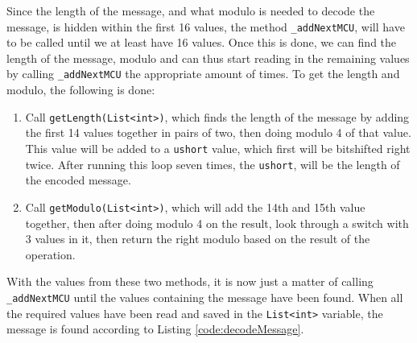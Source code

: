 Since the length of the message, and what modulo is needed to decode the message, is hidden within the first 16 values, the method \lstinline|_addNextMCU|, will have to be called until we at least have 16 values.
Once this is done, we can find the length of the message, modulo and can thus start reading in the remaining values by calling \lstinline|_addNextMCU| the appropriate amount of times.
To get the length and modulo, the following is done:
\begin{enumerate}
	\item Call \lstinline|getLength(List<int>)|, which finds the length of the message by adding the first 14 values together in pairs of two, then doing modulo 4 of that value. 
	This value will be added to a \lstinline|ushort| value, which first will be bitshifted right twice. 
	After running this loop seven times, the \lstinline|ushort|, will be the length of the encoded message.
	\item Call \lstinline|getModulo(List<int>)|, which will add the 14th and 15th value together, then after doing modulo 4 on the result, look through a switch with 3 values in it, then return the right modulo based on the result of the operation.
\end{enumerate}
With the values from these two methods, it is now just a matter of calling \lstinline|_addNextMCU| until the values containing the message have been found.
When all the required values have been read and saved in the \lstinline|List<int>| variable, the message is found according to Listing \ref{code:decodeMessage}.

